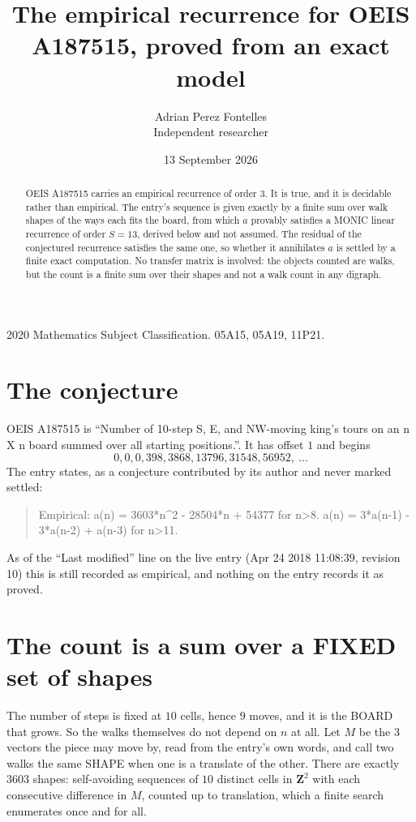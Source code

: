 \documentclass[11pt,a4paper]{article}
\title{The empirical recurrence for OEIS A187515, proved from an exact model}
\author{Adrian Perez Fontelles\\ \small Independent researcher}
\date{13 September 2026}
\theoremstyle{plain}
\theoremstyle{definition}
\begin{document}
\maketitle

\begin{abstract}
OEIS A187515 carries an empirical recurrence of order $3$. It is true, and it is
decidable rather than empirical. The entry's sequence is given exactly by a finite sum over walk shapes of the ways each fits the board, from
which $a$ provably satisfies a MONIC linear recurrence of order $S=13$, derived below and not
assumed. The residual of the conjectured recurrence satisfies the same one, so whether it
annihilates $a$ is settled by a finite exact computation. No transfer matrix is involved: the objects counted are walks, but the count is a finite sum over their shapes and not a walk count in any digraph.
\end{abstract}

\noindent\small 2020 Mathematics Subject Classification. 05A15, 05A19, 11P21.\normalsize

\section{The conjecture}

OEIS A187515 is ``Number of 10-step S, E, and NW-moving king's tours on an n X n board summed over all starting positions.''. It has offset $1$ and begins
\[
0, 0, 0, 398, 3868, 13796, 31548, 56952,\ \dots
\]
The entry states, as a conjecture contributed by its author and never marked settled:
\begin{quote}
Empirical: a(n) = 3603*n\^{}2 - 28504*n + 54377 for n>8. a(n) = 3*a(n-1) - 3*a(n-2) + a(n-3) for n>11.
\end{quote}
As of the ``Last modified'' line on the live entry (Apr 24 2018 11:08:39, revision 10)
this is still recorded as empirical, and nothing on the entry records it as proved.

\section{The count is a sum over a FIXED set of shapes}

The number of steps is fixed at $10$ cells, hence $9$ moves, and it is the BOARD
that grows. So the walks themselves do not depend on $n$ at all. Let $M$ be the $3$
vectors the piece may move by, read from the entry's own words, and call two walks the same
SHAPE when one is a translate of the other. There are exactly $3603$ shapes: self-avoiding
sequences of $10$ distinct cells in $\mathbf{Z}^{2}$ with each consecutive difference in
$M$, counted up to translation, which a finite search enumerates once and for all.
\end{document}
